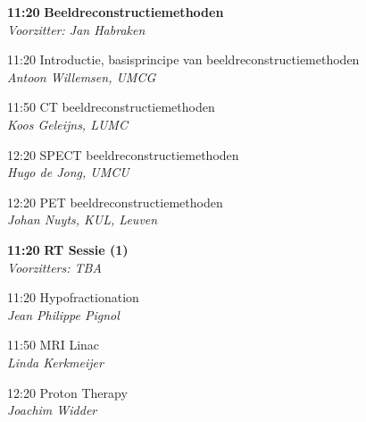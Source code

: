 \documentclass[a4paper,10pt]{report}
\begin{document}
\begin{multicols*}{3}
\begin{packed_enum}
\item[\textbf{11:20}]\textbf{Beeldreconstructiemethoden}\\\textit{Voorzitter: Jan Habraken}
\item[11:20] Introductie, basisprincipe van beeldreconstructiemethoden\\\textit{Antoon Willemsen, UMCG}
\item[11:50] CT beeldreconstructiemethoden\\\textit{Koos Geleijns, LUMC}
\item[12:20] SPECT beeldreconstructiemethoden\\\textit{Hugo de Jong, UMCU}
\item[12:20] PET beeldreconstructiemethoden\\\textit{Johan Nuyts, KUL, Leuven}
\end{packed_enum}

\begin{packed_enum}
\item[\textbf{11:20}]{\textbf{RT Sessie (1)}}\\\textit{Voorzitters: TBA}
\item[11:20] Hypofractionation\\\textit{Jean Philippe Pignol}
\item[11:50] MRI Linac\\\textit{Linda Kerkmeijer}
\item[12:20] Proton Therapy\\\textit{Joachim Widder}
\end{packed_enum}


\end{multicols*}
\end{document}
